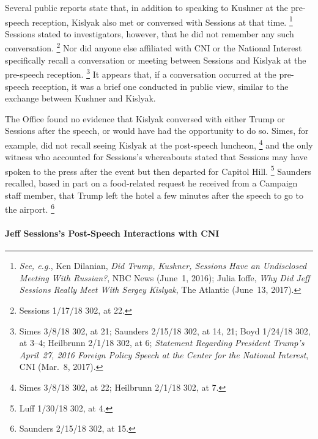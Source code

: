 Several public reports state that, in addition to speaking to Kushner at the pre-speech reception, Kislyak also met or conversed with Sessions at that time.%
\footnote{\textit{See, e.g.}, Ken Dilanian, \textit{Did Trump, Kushner, Sessions Have an Undisclosed Meeting With Russian?}, NBC News (June~1, 2016);
Julia Ioffe, \textit{Why Did Jeff Sessions Really Meet With Sergey Kislyak}, The Atlantic (June~13, 2017).}
Sessions stated to investigators, however, that he did not remember any such conversation.%
\footnote{Sessions 1/17/18 302, at 22.}
Nor did anyone else affiliated with CNI or the National Interest specifically recall a conversation or meeting between Sessions and Kislyak at the pre-speech reception.%
\footnote{Simes 3/8/18 302, at 21;
Saunders 2/15/18 302, at 14, 21;
Boyd 1/24/18 302, at 3--4;
Heilbrunn 2/1/18 302, at 6;
\textit{Statement Regarding President Trump's April~27, 2016 Foreign Policy Speech at the Center for the National Interest}, CNI (Mar.~8, 2017).}
It appears that, if a conversation occurred at the pre-speech reception, it was a brief one conducted in public view, similar to the exchange between Kushner and Kislyak.

The Office found no evidence that Kislyak conversed with either Trump or Sessions after the speech, or would have had the opportunity to do so.
Simes, for example, did not recall seeing Kislyak at the post-speech luncheon,%
\footnote{Simes 3/8/18 302, at 22;
Heilbrunn 2/1/18 302, at 7.}
and the only witness who accounted for Sessions's whereabouts stated that Sessions may have spoken to the press after the event but then departed for Capitol Hill.%
\footnote{Luff 1/30/18 302, at 4.}
Saunders recalled, based in part on a food-related request he received from a Campaign staff member, that Trump left the hotel a few minutes after the speech to go to the airport.%
\footnote{Saunders 2/15/18 302, at 15.}

\paragraph{Jeff Sessions's Post-Speech Interactions with CNI}

